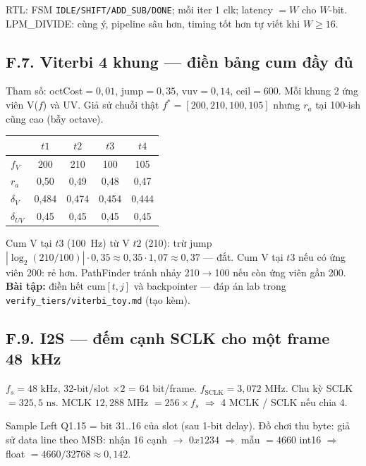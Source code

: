 RTL: FSM \texttt{IDLE/SHIFT/ADD\_SUB/DONE}; mỗi iter 1 clk; latency $=W$ cho $W$-bit. LPM\_DIVIDE: cùng ý, pipeline sâu hơn, timing tốt hơn tự viết khi $W\ge16$.

\subsection*{F.7. Viterbi 4 khung --- điền bảng cum đầy đủ}

Tham số: octCost$=0{,}01$, jump$=0{,}35$, vuv$=0{,}14$, ceil$=600$.
Mỗi khung 2 ứng viên V($f$) và UV. Giả sử chuỗi thật $f^*=[200,210,100,105]$ nhưng $r_a$ tại 100-ish cũng cao (bẫy octave).

\begin{center}\footnotesize
\begin{tabular}{@{}lcccc@{}}
\toprule
 & $t1$ & $t2$ & $t3$ & $t4$ \\
\midrule
$f_V$ & 200 & 210 & 100 & 105 \\
$r_a$ & 0{,}50 & 0{,}49 & 0{,}48 & 0{,}47 \\
$\delta_V$ & 0{,}484 & 0{,}474 & 0{,}454 & 0{,}444 \\
$\delta_{UV}$ & 0{,}45 & 0{,}45 & 0{,}45 & 0{,}45 \\
\bottomrule
\end{tabular}
\end{center}

Cum V tại $t3$ (100~Hz) từ V $t2$ (210): trừ jump $|\log_2(210/100)|\cdot0{,}35\approx0{,}35\cdot1{,}07\approx0{,}37$ --- đắt.
Cum V tại $t3$ nếu có ứng viên 200: rẻ hơn. PathFinder tránh nhảy 210$\to$100 nếu còn ứng viên gần 200. \textbf{Bài tập:} điền hết $\mathrm{cum}[t,j]$ và backpointer --- đáp án lab trong \texttt{verify\_tiers/viterbi\_toy.md} (tạo kèm).

\subsection*{F.9. I2S --- đếm cạnh SCLK cho một frame 48~kHz}

$f_s=48\text{ kHz}$, 32-bit/slot $\times2$ = 64 bit/frame.
$f_{\mathrm{SCLK}}=3{,}072\text{ MHz}$. Chu kỳ SCLK $=325{,}5\text{ ns}$.
MCLK $12{,}288\text{ MHz}$ $=256\times f_s$ $\Rightarrow$ 4 MCLK / SCLK nếu chia 4.

Sample Left Q1.15 = bit 31..16 của slot (sau 1-bit delay). Đồ chơi thu byte: giả sử data line theo MSB: nhận 16 cạnh $\to$ $0x1234$ $\Rightarrow$ mẫu $=4660$ int16 $\Rightarrow$ float $=4660/32768\approx0{,}142$.

